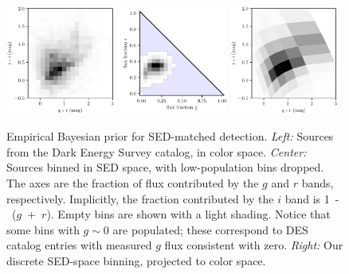 \documentclass[11pt,letterpaper,linenumbers]{aastex63}
\begin{document}
\begin{figure}
  \begin{center}
    \includegraphics[width=0.32\textwidth]{bayes-data-cc}
    \includegraphics[width=0.32\textwidth]{bayes-prior-sed}
    \includegraphics[width=0.32\textwidth]{bayes-prior-cc}
    \caption{Empirical Bayesian prior for SED-matched detection.
      \emph{Left:} Sources from the Dark Energy Survey catalog, in
      color space.  \emph{Center:} Sources binned in SED space, with
      low-population bins dropped.  The axes are the fraction of flux
      contributed by the $g$ and $r$ bands, respectively.  Implicitly,
      the fraction contributed by the $i$ band is \mbox{1 - ($g$ +
        $r$).}  Empty bins are shown with a light shading.  Notice
      that some bins with $g \sim 0$ are populated; these correspond
      to DES catalog entries with measured $g$ flux consistent with
      zero.  \emph{Right:} Our discrete SED-space binning, projected
      to color space.
      \label{fig:prior}}
  \end{center}
\end{figure}
\end{document}
